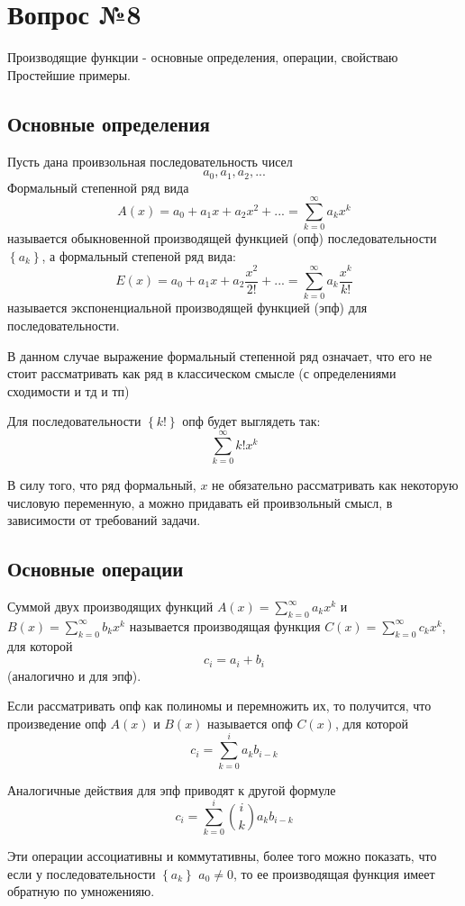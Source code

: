 \chapter{Вопрос №8}

Производящие функции - основные определения, операции, свойстваю Простейшие примеры.

\section{Основные определения}

Пусть дана проивзольная последовательность чисел $$ a_0, a_1, a_2, ... $$
Формальный степенной ряд вида $$ A\left(x\right) = a_0 + a_1x + a_2x^2 + ... = \sum_{k=0}^\infty a_k x^k$$
называется обыкновенной производящей функцией (опф) последовательности $\left\{a_k\right\}$, а формальный степеной ряд вида: $$ E\left(x\right) = a_0 + a_1 x + a_2 \frac{x^2}{2!} + ... = \sum_{k=0}^\infty a_k\frac{x^k}{k!} $$
называется экспоненциальной производящей функцией (эпф) для последовательности.

В данном случае выражение формальный степенной ряд означает, что его не стоит рассматривать как ряд в классическом смысле (с определениями сходимости и тд и тп)

Для последовательности $\left\{k!\right\}$ опф будет выглядеть так: $$ \sum_{k=0}^\infty k! x^k $$

В силу того, что ряд формальный, $x$ не обязательно рассматривать как некоторую числовую переменную, а можно придавать ей проивзольный смысл, в зависимости от требований задачи.

\section{Основные операции}

Суммой двух производящих функций $A\left(x\right) = \sum_{k=0}^\infty a_k x^k$ и $B\left(x\right) = \sum_{k=0}^\infty b_k x^k$ называется производящая функция $C\left(x\right) = \sum_{k=0}^\infty c_k x^k$, для которой $$c_i = a_i + b_i$$ (аналогично и для эпф).

Если рассматривать опф как полиномы и перемножить их, то получится, что произведение опф $A\left(x\right)$ и $B\left(x\right)$ называется опф $C\left(x\right)$, для которой $$ c_i = \sum_{k=0}^i a_kb_{i-k}$$

Аналогичные действия для эпф приводят к другой формуле $$ c_i = \sum_{k=0}^i \binom{i}{k} a_kb_{i-k} $$

Эти операции ассоциативны и коммутативны, более того можно показать, что если у последовательности $\left\{a_k\right\}$ $a_0 \not= 0$, то ее производящая функция имеет обратную по умноженияю.

